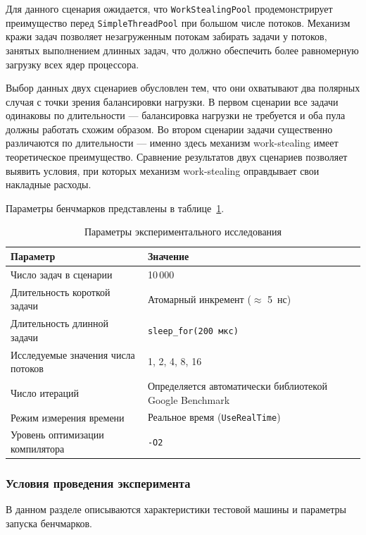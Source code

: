 Для данного сценария ожидается, что \texttt{WorkStealingPool}
продемонстрирует преимущество перед \texttt{SimpleThreadPool}
при большом числе потоков. Механизм кражи задач позволяет
незагруженным потокам забирать задачи у потоков, занятых
выполнением длинных задач, что должно обеспечить более
равномерную загрузку всех ядер процессора.

Выбор данных двух сценариев обусловлен тем, что они охватывают
два полярных случая с точки зрения балансировки нагрузки.
В первом сценарии все задачи одинаковы по длительности ---
балансировка нагрузки не требуется и оба пула должны работать
схожим образом. Во втором сценарии задачи существенно различаются
по длительности --- именно здесь механизм work-stealing имеет
теоретическое преимущество. Сравнение результатов двух сценариев
позволяет выявить условия, при которых механизм work-stealing
оправдывает свои накладные расходы.

Параметры бенчмарков представлены в таблице~\ref{tab:bench-params}.

\begin{table}[h]
\caption{Параметры экспериментального исследования}
\label{tab:bench-params}
\begin{tabularx}{\textwidth}{|l|X|}
\hline
\textbf{Параметр} & \textbf{Значение} \\
\hline
Число задач в сценарии & 10\,000 \\
\hline
Длительность короткой задачи &
Атомарный инкремент ($\approx$ 5~нс) \\
\hline
Длительность длинной задачи &
\texttt{sleep\_for(200~мкс)} \\
\hline
Исследуемые значения числа потоков &
1, 2, 4, 8, 16 \\
\hline
Число итераций & Определяется автоматически
                 библиотекой Google Benchmark \\
\hline
Режим измерения времени & Реальное время (\texttt{UseRealTime}) \\
\hline
Уровень оптимизации компилятора & \texttt{-O2} \\
\hline
\end{tabularx}
\end{table}

\subsubsection{Условия проведения эксперимента}

В данном разделе описываются характеристики тестовой машины и параметры
запуска бенчмарков.

